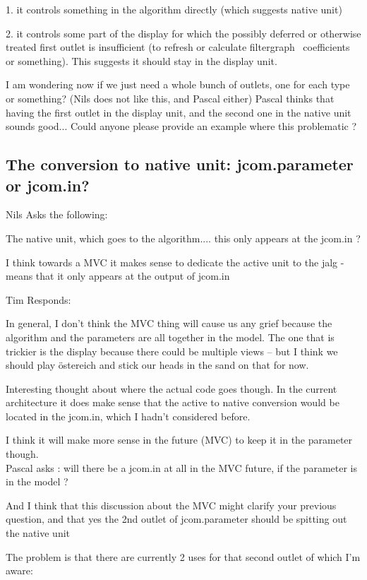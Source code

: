 \documentclass[]{article}
\begin{document}
1. it controls something in the algorithm directly (which suggests native unit)
 
2. it controls some part of the display for which the possibly deferred or otherwise treated first outlet is insufficient (to refresh or calculate filtergraph~ coefficients or something).  This suggests it should stay in the display unit.


I am wondering now if we just need a whole bunch of outlets, one for each type or something?  (Nils does not like this, and Pascal either)
Pascal thinks that having the first outlet in the display unit, and the second one in the native unit sounds good... Could anyone please provide an example where this problematic ?



\subsection{The conversion to native unit: jcom.parameter or jcom.in?}

Nils Asks the following:

The native unit, which goes to the algorithm....  this only appears at the jcom.in ?

I think towards a MVC it makes sense to dedicate the active unit to the jalg - means that it only appears at the output of jcom.in


Tim Responds:

In general, I don't think the MVC thing will cause us any grief because the algorithm and the parameters are all together in the model.  The one that is trickier is the display because there could be multiple views -- but I think we should play östereich and stick our heads in the sand on that for now.

 
Interesting thought about where the actual code goes though.  In the current architecture it does make sense that the active to native conversion would be located in the jcom.in, which I hadn't considered before.

 
I think it will make more sense in the future (MVC) to keep it in the parameter though.\\
Pascal asks : will there be a jcom.in at all in the MVC future, if the parameter is in the model ?

And I think that this discussion about the MVC might clarify your previous question, and that yes the 2nd outlet of jcom.parameter should be spitting out the native unit

The problem is that there are currently 2 uses for that second outlet of which I'm aware:
\end{document}
